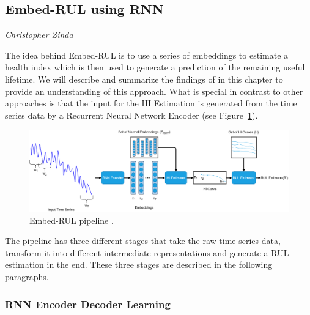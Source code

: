 \subsection{Embed-RUL using RNN}
\vspace*{-12.5mm}\hfill{\normalsize\emph{Christopher Zinda}}
\label{sec:rul_estimation:approaches:embed_rul}

The idea behind Embed-RUL is to use a series of embeddings to estimate a health index which is then used to generate a prediction of the remaining useful lifetime. We will describe and summarize the findings of \cite{DBLP:journals/corr/abs-1709-01073} in this chapter to provide an understanding of this approach. What is special in contrast to other approaches is that the input for the HI Estimation is generated from the time series data by a Recurrent Neural Network Encoder (see Figure~\ref{fig:embed_rul}).
\begin{figure}[ht]
    \includegraphics[width=\textwidth]{gfx/rul_embed_rul_pipeline.drawio}
    \caption{Embed-RUL pipeline \cite{DBLP:journals/corr/abs-1709-01073}.}
    \label{fig:embed_rul}
\end{figure}

The pipeline has three different stages that take the raw time series data, transform it into different intermediate representations and generate a RUL estimation in the end. These three stages are described in the following paragraphs.

\subsubsection*{RNN Encoder Decoder Learning}
\label{sec:rul_estimation:approaches:embed_rul:rnn_encoder_decoder_learning}

